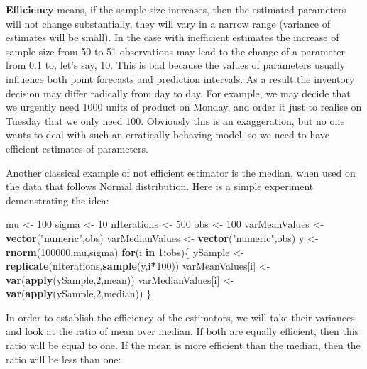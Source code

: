 \documentclass[
]{book}
\newenvironment{Shaded}{\begin{snugshade}}{\end{snugshade}}
\newcommand{\ControlFlowTok}[1]{\textcolor[rgb]{0.13,0.29,0.53}{\textbf{#1}}}
\newcommand{\DecValTok}[1]{\textcolor[rgb]{0.00,0.00,0.81}{#1}}
\newcommand{\FunctionTok}[1]{\textcolor[rgb]{0.13,0.29,0.53}{\textbf{#1}}}
\newcommand{\NormalTok}[1]{#1}
\newcommand{\OtherTok}[1]{\textcolor[rgb]{0.56,0.35,0.01}{#1}}
\newcommand{\SpecialCharTok}[1]{\textcolor[rgb]{0.81,0.36,0.00}{\textbf{#1}}}
\newcommand{\StringTok}[1]{\textcolor[rgb]{0.31,0.60,0.02}{#1}}
\theoremstyle{definition}
\theoremstyle{definition}
\theoremstyle{definition}
\theoremstyle{definition}
\theoremstyle{remark}
\begin{document}
\textbf{Efficiency} means, if the sample size increases, then the estimated parameters will not change substantially, they will vary in a narrow range (variance of estimates will be small). In the case with inefficient estimates the increase of sample size from 50 to 51 observations may lead to the change of a parameter from 0.1 to, let's say, 10. This is bad because the values of parameters usually influence both point forecasts and prediction intervals. As a result the inventory decision may differ radically from day to day. For example, we may decide that we urgently need 1000 units of product on Monday, and order it just to realise on Tuesday that we only need 100. Obviously this is an exaggeration, but no one wants to deal with such an erratically behaving model, so we need to have efficient estimates of parameters.

Another classical example of not efficient estimator is the median, when used on the data that follows Normal distribution. Here is a simple experiment demonstrating the idea:

\begin{Shaded}
\begin{Highlighting}[]
\NormalTok{mu }\OtherTok{\textless{}{-}} \DecValTok{100}
\NormalTok{sigma }\OtherTok{\textless{}{-}} \DecValTok{10}
\NormalTok{nIterations }\OtherTok{\textless{}{-}} \DecValTok{500}
\NormalTok{obs }\OtherTok{\textless{}{-}} \DecValTok{100}
\NormalTok{varMeanValues }\OtherTok{\textless{}{-}} \FunctionTok{vector}\NormalTok{(}\StringTok{"numeric"}\NormalTok{,obs)}
\NormalTok{varMedianValues }\OtherTok{\textless{}{-}} \FunctionTok{vector}\NormalTok{(}\StringTok{"numeric"}\NormalTok{,obs)}
\NormalTok{y }\OtherTok{\textless{}{-}} \FunctionTok{rnorm}\NormalTok{(}\DecValTok{100000}\NormalTok{,mu,sigma)}
\ControlFlowTok{for}\NormalTok{(i }\ControlFlowTok{in} \DecValTok{1}\SpecialCharTok{:}\NormalTok{obs)\{}
\NormalTok{    ySample }\OtherTok{\textless{}{-}} \FunctionTok{replicate}\NormalTok{(nIterations,}\FunctionTok{sample}\NormalTok{(y,i}\SpecialCharTok{*}\DecValTok{100}\NormalTok{))}
\NormalTok{    varMeanValues[i] }\OtherTok{\textless{}{-}} \FunctionTok{var}\NormalTok{(}\FunctionTok{apply}\NormalTok{(ySample,}\DecValTok{2}\NormalTok{,mean))}
\NormalTok{    varMedianValues[i] }\OtherTok{\textless{}{-}} \FunctionTok{var}\NormalTok{(}\FunctionTok{apply}\NormalTok{(ySample,}\DecValTok{2}\NormalTok{,median))}
\NormalTok{\}}
\end{Highlighting}
\end{Shaded}

In order to establish the efficiency of the estimators, we will take their variances and look at the ratio of mean over median. If both are equally efficient, then this ratio will be equal to one. If the mean is more efficient than the median, then the ratio will be less than one:
\end{document}
